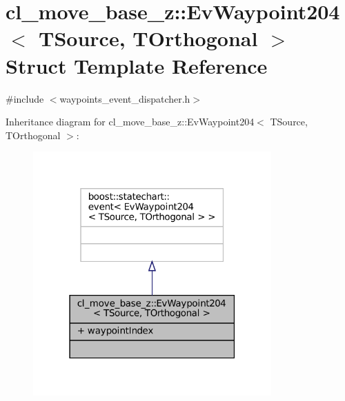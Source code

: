 \hypertarget{structcl__move__base__z_1_1EvWaypoint204}{}\section{cl\+\_\+move\+\_\+base\+\_\+z\+:\+:Ev\+Waypoint204$<$ T\+Source, T\+Orthogonal $>$ Struct Template Reference}
\label{structcl__move__base__z_1_1EvWaypoint204}


{\ttfamily \#include $<$waypoints\+\_\+event\+\_\+dispatcher.\+h$>$}



Inheritance diagram for cl\+\_\+move\+\_\+base\+\_\+z\+:\+:Ev\+Waypoint204$<$ T\+Source, T\+Orthogonal $>$\+:
\nopagebreak
\begin{figure}[H]
\begin{center}
\leavevmode
\includegraphics[width=259pt]{structcl__move__base__z_1_1EvWaypoint204__inherit__graph}
\end{center}
\end{figure}


